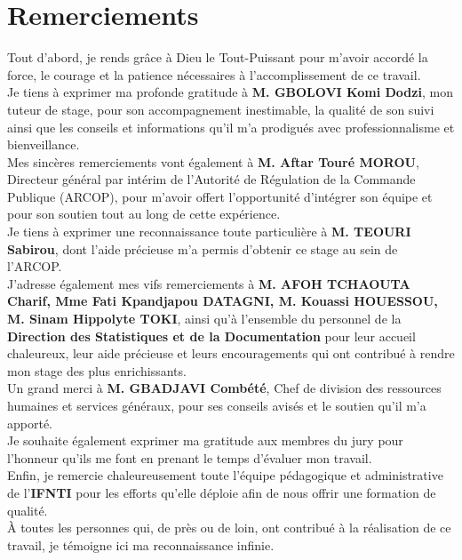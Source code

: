 \chapter*{Remerciements}
\thispagestyle{empty}

Tout d’abord, je rends grâce à Dieu le Tout-Puissant pour m’avoir accordé la force, le courage et la patience nécessaires à l’accomplissement de ce travail.\\

Je tiens à exprimer ma profonde gratitude à \textbf{M. GBOLOVI Komi Dodzi}, mon tuteur de stage, pour son accompagnement inestimable, la qualité de son suivi ainsi que les conseils et informations qu’il m’a prodigués avec professionnalisme et bienveillance.\\

Mes sincères remerciements vont également à \textbf{M. Aftar Touré MOROU}, Directeur général par intérim de l’Autorité de Régulation de la Commande Publique (ARCOP), pour m’avoir offert l’opportunité d’intégrer son équipe et pour son soutien tout au long de cette expérience.\\

Je tiens à exprimer une reconnaissance toute particulière à \textbf{M. TEOURI Sabirou}, dont l’aide précieuse m’a permis d’obtenir ce stage au sein de l’ARCOP.\\

J’adresse également mes vifs remerciements à \textbf{M. AFOH TCHAOUTA Charif, Mme Fati Kpandjapou DATAGNI, M. Kouassi HOUESSOU, M. Sinam Hippolyte TOKI}, ainsi qu’à l’ensemble du personnel de la \textbf{Direction des Statistiques et de la Documentation} pour leur accueil chaleureux, leur aide précieuse et leurs encouragements qui ont contribué à rendre mon stage des plus enrichissants.\\

Un grand merci à \textbf{M. GBADJAVI Combété}, Chef de division des ressources humaines et services généraux, pour ses conseils avisés et le soutien qu’il m’a apporté.\\

Je souhaite également exprimer ma gratitude aux membres du jury pour l’honneur qu’ils me font en prenant le temps d’évaluer mon travail.\\

Enfin, je remercie chaleureusement toute l’équipe pédagogique et administrative de l’\textbf{IFNTI} pour les efforts qu’elle déploie afin de nous offrir une formation de qualité.\\

À toutes les personnes qui, de près ou de loin, ont contribué à la réalisation de ce travail, je témoigne ici ma reconnaissance infinie.


\clearpage